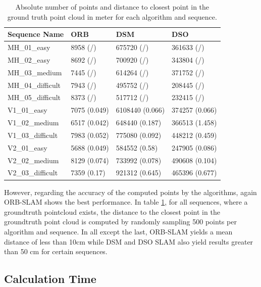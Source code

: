 	\begin{table}
	\caption{Absolute number of points and distance to closest point in the ground truth point cloud in meter for each algorithm and sequence.}
	\begin{tabular}{ |p{3cm}||p{3cm}|p{3cm}|p{3cm}|  }
	\hline
	Sequence Name& ORB & DSM & DSO \\
	\hline
	MH\_01\_easy & 8958 (/) & 675720 (/) & 361633 (/)\\
	MH\_02\_easy & 8692 (/) & 700920 (/) & 343804 (/)\\
	MH\_03\_medium & 7445 (/) & 614264 (/) & 371752 (/)\\
	MH\_04\_difficult & 7943 (/) & 495752 (/) & 208445 (/)\\
	MH\_05\_difficult & 8373 (/) & 517712 (/) & 232415 (/)\\
	V1\_01\_easy & 7075 (0.049) & 6108440 (0.066) & 374257 (0.066)\\
	V1\_02\_medium & 6517 (0.042) & 648440 (0.187) & 366513 (1.458)\\
	V1\_03\_difficult & 7983 (0.052) & 775080 (0.092) & 448212 (0.459)\\
	V2\_01\_easy & 5688 (0.049) & 584552 (0.58) & 247905 (0.086)\\
	V2\_02\_medium & 8129 (0.074)& 733992 (0.078) & 490608 (0.104)\\
	V2\_03\_difficult & 7359 (0.17) & 921312 (0.645) & 465396 (0.677)\\
	\hline
	\end{tabular}
	\label{table:pointcloud}
	\end{table}
	
	However, regarding the accuracy of the computed points by the algorithms, again ORB-SLAM shows the best performance. In table \ref{table:pointcloud}, 
	for all sequences, where a groundtruth pointcloud exists, the distance to the closest point in the groundtruth point cloud is computed by randomly sampling
	500 points per algorithm and sequence. In all except the last, ORB-SLAM yields a mean distance of less than 10cm while DSM and DSO SLAM also yield results 
	greater than 50 cm for certain sequences. 
	
	
	
	

\subsection{Calculation Time}

